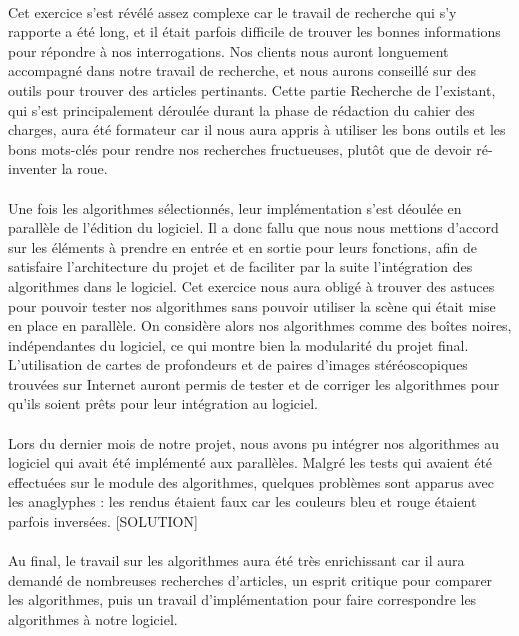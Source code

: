 \paragraph{}
Cet exercice s'est révélé assez complexe car le travail de recherche qui s'y rapporte a été long, et il était parfois difficile de trouver les bonnes informations pour répondre à nos interrogations. Nos clients nous auront longuement accompagné dans notre travail de recherche, et nous aurons conseillé sur des outils pour trouver des articles pertinants. Cette partie Recherche de l'existant, qui s'est principalement déroulée durant la phase de rédaction du cahier des charges, aura été formateur car il nous aura appris à utiliser les bons outils et les bons mots-clés pour rendre nos recherches fructueuses, plutôt que de devoir ré-inventer la roue.

\paragraph{}
Une fois les algorithmes sélectionnés, leur implémentation s'est déoulée en parallèle de l'édition du logiciel. Il a donc fallu que nous nous mettions d'accord sur les éléments à prendre en entrée et en sortie pour leurs fonctions, afin de satisfaire l'architecture du projet et de faciliter par la suite l'intégration des algorithmes dans le logiciel.
Cet exercice nous aura obligé à trouver des astuces pour pouvoir tester nos algorithmes sans pouvoir utiliser la scène qui était mise en place en parallèle. On considère alors nos algorithmes comme des boîtes noires, indépendantes du logiciel, ce qui montre bien la modularité du projet final.
L'utilisation de cartes de profondeurs et de paires d'images stéréoscopiques trouvées sur Internet auront permis de tester et de corriger les algorithmes pour qu'ils soient prêts pour leur intégration au logiciel.

\paragraph{}
Lors du dernier mois de notre projet, nous avons pu intégrer nos algorithmes au logiciel qui avait été implémenté aux parallèles. Malgré les tests qui avaient été effectuées sur le module des algorithmes, quelques problèmes sont apparus avec les anaglyphes : les rendus étaient faux car les couleurs bleu et rouge étaient parfois inversées.
[SOLUTION]

\paragraph{}
Au final, le travail sur les algorithmes aura été très enrichissant car il aura demandé de nombreuses recherches d'articles, un esprit critique pour comparer les algorithmes, puis un travail d'implémentation pour faire correspondre les algorithmes à notre logiciel.


